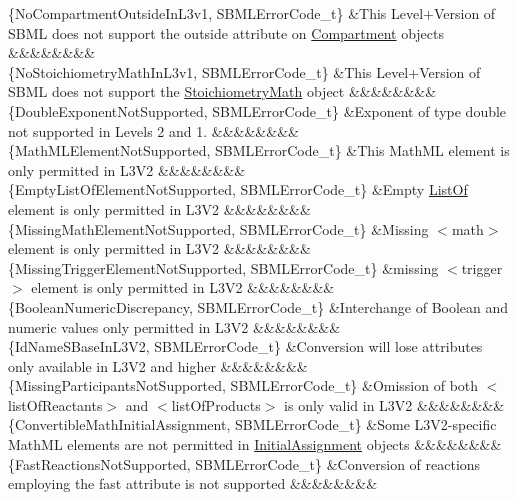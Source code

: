 \begin{DoxyParagraph}{}
\begin{longtabu}
\{No\+Compartment\+Outside\+In\+L3v1, S\+B\+M\+L\+Error\+Code\+\_\+t\} &This Level+\+Version of S\+B\+ML does not support the \textquotesingle{}outside\textquotesingle{} attribute on \hyperlink{class_compartment}{Compartment} objects &&&&&&&&\\
\{No\+Stoichiometry\+Math\+In\+L3v1, S\+B\+M\+L\+Error\+Code\+\_\+t\} &This Level+\+Version of S\+B\+ML does not support the \hyperlink{class_stoichiometry_math}{Stoichiometry\+Math} object &&&&&&&&\\
\{Double\+Exponent\+Not\+Supported, S\+B\+M\+L\+Error\+Code\+\_\+t\} &Exponent of type double not supported in Levels 2 and 1. &&&&&&&&\\
\{Math\+M\+L\+Element\+Not\+Supported, S\+B\+M\+L\+Error\+Code\+\_\+t\} &This Math\+ML element is only permitted in L3\+V2 &&&&&&&&\\
\{Empty\+List\+Of\+Element\+Not\+Supported, S\+B\+M\+L\+Error\+Code\+\_\+t\} &Empty \textquotesingle{}\hyperlink{class_list_of}{List\+Of}\textquotesingle{} element is only permitted in L3\+V2 &&&&&&&&\\
\{Missing\+Math\+Element\+Not\+Supported, S\+B\+M\+L\+Error\+Code\+\_\+t\} &Missing {\ttfamily $<$math$>$} element is only permitted in L3\+V2 &&&&&&&&\\
\{Missing\+Trigger\+Element\+Not\+Supported, S\+B\+M\+L\+Error\+Code\+\_\+t\} &missing {\ttfamily $<$trigger$>$} element is only permitted in L3\+V2 &&&&&&&&\\
\{Boolean\+Numeric\+Discrepancy, S\+B\+M\+L\+Error\+Code\+\_\+t\} &Interchange of Boolean and numeric values only permitted in L3\+V2 &&&&&&&&\\
\{Id\+Name\+S\+Base\+In\+L3\+V2, S\+B\+M\+L\+Error\+Code\+\_\+t\} &Conversion will lose attributes only available in L3\+V2 and higher &&&&&&&&\\
\{Missing\+Participants\+Not\+Supported, S\+B\+M\+L\+Error\+Code\+\_\+t\} &Omission of both {\ttfamily $<$list\+Of\+Reactants$>$} and {\ttfamily $<$list\+Of\+Products$>$} is only valid in L3\+V2 &&&&&&&&\\
\{Convertible\+Math\+Initial\+Assignment, S\+B\+M\+L\+Error\+Code\+\_\+t\} &Some L3\+V2-\/specific Math\+ML elements are not permitted in \hyperlink{class_initial_assignment}{Initial\+Assignment} objects &&&&&&&&\\
\{Fast\+Reactions\+Not\+Supported, S\+B\+M\+L\+Error\+Code\+\_\+t\} &Conversion of reactions employing the \textquotesingle{}fast\textquotesingle{} attribute is not supported &&&&&&&&\\

\end{longtabu}
\end{DoxyParagraph}
